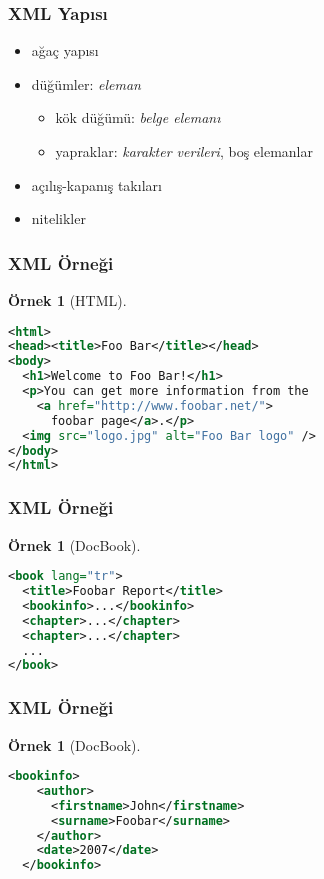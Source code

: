 \documentclass[dvipsnames]{beamer}
\theoremstyle{definition}
\theoremstyle{example}
\newtheorem{ornek}[theorem]{Örnek}
\theoremstyle{plain}
\begin{document}
\begin{frame}
  \frametitle{XML Yapısı}

  \begin{itemize}
    \item ağaç yapısı

    \item düğümler: \emph{eleman}
    \begin{itemize}
      \item kök düğümü: \emph{belge elemanı}
      \item yapraklar: \emph{karakter verileri}, boş elemanlar
    \end{itemize}

    \pause
    \medskip
    \item açılış-kapanış takıları
    \item nitelikler
  \end{itemize}
\end{frame}

\begin{frame}[fragile]
  \frametitle{XML Örneği}

  \begin{ornek}[HTML]
    \begin{lstlisting}[language=XML]
<html>
<head><title>Foo Bar</title></head>
<body>
  <h1>Welcome to Foo Bar!</h1>
  <p>You can get more information from the
    <a href="http://www.foobar.net/">
      foobar page</a>.</p>
  <img src="logo.jpg" alt="Foo Bar logo" />
</body>
</html>
    \end{lstlisting}
  \end{ornek}
\end{frame}

\begin{frame}[fragile]
  \frametitle{XML Örneği}

  \begin{ornek}[DocBook]
    \begin{lstlisting}[language=XML]
<book lang="tr">
  <title>Foobar Report</title>
  <bookinfo>...</bookinfo>
  <chapter>...</chapter>
  <chapter>...</chapter>
  ...
</book>
    \end{lstlisting}
  \end{ornek}
\end{frame}

\begin{frame}[fragile]
  \frametitle{XML Örneği}

  \begin{ornek}[DocBook]
    \begin{lstlisting}[language=XML]
  <bookinfo>
    <author>
      <firstname>John</firstname>
      <surname>Foobar</surname>
    </author>
    <date>2007</date>
  </bookinfo>
    \end{lstlisting}
  \end{ornek}
\end{frame}
\end{document}
